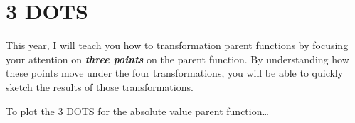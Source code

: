 

\section*{3 DOTS}

This year,
I will teach you how to transformation parent functions
by focusing your attention on {\bfseries\itshape three points} on the parent function.
By understanding how these points move 
under the four transformations, you will be able to quickly sketch the results of those transformations.

\begin{myConceptSteps}{To plot the 3 DOTS for the absolute value parent function\dots}
\end{myConceptSteps}




